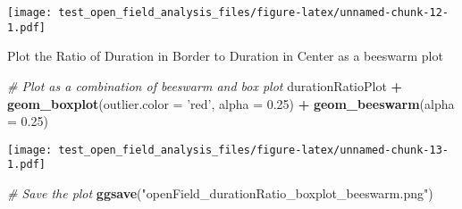 \documentclass[]{article}
\newenvironment{Shaded}{\begin{snugshade}}{\end{snugshade}}
\newcommand{\KeywordTok}[1]{\textcolor[rgb]{0.13,0.29,0.53}{\textbf{#1}}}
\newcommand{\DataTypeTok}[1]{\textcolor[rgb]{0.13,0.29,0.53}{#1}}
\newcommand{\FloatTok}[1]{\textcolor[rgb]{0.00,0.00,0.81}{#1}}
\newcommand{\StringTok}[1]{\textcolor[rgb]{0.31,0.60,0.02}{#1}}
\newcommand{\CommentTok}[1]{\textcolor[rgb]{0.56,0.35,0.01}{\textit{#1}}}
\newcommand{\OperatorTok}[1]{\textcolor[rgb]{0.81,0.36,0.00}{\textbf{#1}}}
\newcommand{\NormalTok}[1]{#1}
\begin{document}
\texttt{[image: test\_open\_field\_analysis\_files/figure-latex/unnamed-chunk-12-1.pdf]}

Plot the Ratio of Duration in Border to Duration in Center as a beeswarm
plot

\begin{Shaded}
\begin{Highlighting}[]
\CommentTok{# Plot as a combination of beeswarm and box plot}
\NormalTok{durationRatioPlot }\OperatorTok{+}\StringTok{ }\KeywordTok{geom_boxplot}\NormalTok{(}\DataTypeTok{outlier.color =} \StringTok{'red'}\NormalTok{, }\DataTypeTok{alpha =} \FloatTok{0.25}\NormalTok{) }\OperatorTok{+}
\StringTok{    }\KeywordTok{geom_beeswarm}\NormalTok{(}\DataTypeTok{alpha =} \FloatTok{0.25}\NormalTok{)}
\end{Highlighting}
\end{Shaded}

\texttt{[image: test\_open\_field\_analysis\_files/figure-latex/unnamed-chunk-13-1.pdf]}

\begin{Shaded}
\begin{Highlighting}[]
\CommentTok{# Save the plot}
\KeywordTok{ggsave}\NormalTok{(}\StringTok{"openField_durationRatio_boxplot_beeswarm.png"}\NormalTok{)}
\end{Highlighting}
\end{Shaded}
\end{document}
